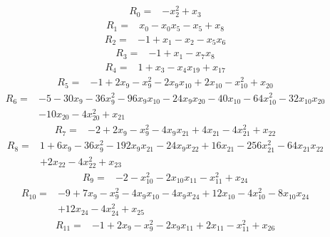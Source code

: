 \begingroup\small
\[
\begin{aligned}
R_{0}={}&-x_{2}^{2}+x_{3}
\end{aligned}
\]
\[
\begin{aligned}
R_{1}={}&x_{0}-x_{0}x_{5}-x_{5}+x_{8}
\end{aligned}
\]
\[
\begin{aligned}
R_{2}={}&-1+x_{1}-x_{2}-x_{5}x_{6}
\end{aligned}
\]
\[
\begin{aligned}
R_{3}={}&-1+x_{1}-x_{7}x_{8}
\end{aligned}
\]
\[
\begin{aligned}
R_{4}={}&1+x_{3}-x_{4}x_{19}+x_{17}
\end{aligned}
\]
\[
\begin{aligned}
R_{5}={}&-1+2x_{9}-x_{9}^{2}-2x_{9}x_{10}+2x_{10}-x_{10}^{2}+x_{20}
\end{aligned}
\]
\[
\begin{aligned}
R_{6}={}&-5-30x_{9}-36x_{9}^{2}-96x_{9}x_{10}-24x_{9}x_{20}-40x_{10}-64x_{10}^{2}-32x_{10}x_{20}\\
&-10x_{20}-4x_{20}^{2}+x_{21}
\end{aligned}
\]
\[
\begin{aligned}
R_{7}={}&-2+2x_{9}-x_{9}^{2}-4x_{9}x_{21}+4x_{21}-4x_{21}^{2}+x_{22}
\end{aligned}
\]
\[
\begin{aligned}
R_{8}={}&1+6x_{9}-36x_{9}^{2}-192x_{9}x_{21}-24x_{9}x_{22}+16x_{21}-256x_{21}^{2}-64x_{21}x_{22}\\
&+2x_{22}-4x_{22}^{2}+x_{23}
\end{aligned}
\]
\[
\begin{aligned}
R_{9}={}&-2-x_{10}^{2}-2x_{10}x_{11}-x_{11}^{2}+x_{24}
\end{aligned}
\]
\[
\begin{aligned}
R_{10}={}&-9+7x_{9}-x_{9}^{2}-4x_{9}x_{10}-4x_{9}x_{24}+12x_{10}-4x_{10}^{2}-8x_{10}x_{24}\\
&+12x_{24}-4x_{24}^{2}+x_{25}
\end{aligned}
\]
\[
\begin{aligned}
R_{11}={}&-1+2x_{9}-x_{9}^{2}-2x_{9}x_{11}+2x_{11}-x_{11}^{2}+x_{26}
\end{aligned}
\]
